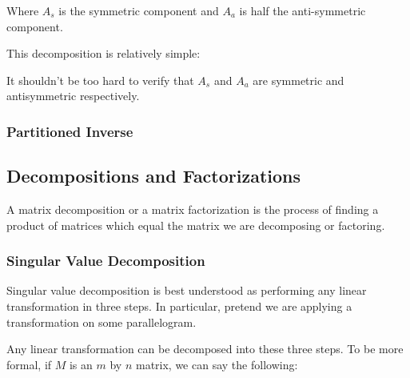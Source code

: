 \documentclass[12pt]{article}
\begin{document}
Where $A_s$ is the symmetric component and $A_a$ is half the anti-symmetric component.

This decomposition is relatively simple:

It shouldn't be too hard to verify that $A_s$ and $A_a$ are symmetric and antisymmetric respectively.

\subsubsection{Partitioned Inverse}


\subsection{Decompositions and Factorizations}

A matrix decomposition or a matrix factorization is the process of finding a product of matrices which equal the matrix we are decomposing or factoring.

\subsubsection{Singular Value Decomposition}


Singular value decomposition is best understood as performing any linear transformation in three steps. In particular, pretend we are applying a transformation on some parallelogram.


Any linear transformation can be decomposed into these three steps. To be more formal, if $M$ is an $m$ by $n$ matrix, we can say the following:

\end{document}
